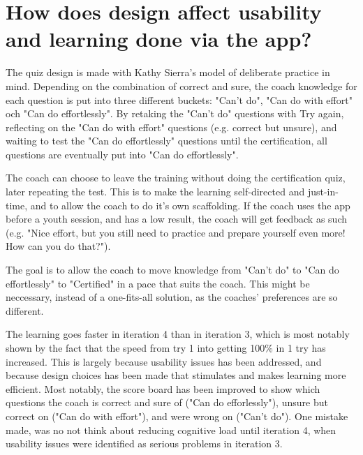 
\section{How does design affect usability and learning done via the app?}

  The quiz design is made with Kathy Sierra's model of deliberate practice in mind. \cite{sierra} Depending on the combination of correct and sure, the coach knowledge for each question is put into three different buckets: "Can't do", "Can do with effort" och "Can do effortlessly". By retaking the "Can't do" questions with Try again, reflecting on the "Can do with effort" questions (e.g. correct but unsure), and waiting to test the "Can do effortlessly" questions until the certification, all questions are eventually put into "Can do effortlessly".

  The coach can choose to leave the training without doing the certification quiz, later repeating the test. This is to make the learning self-directed and just-in-time, and to allow the coach to do it's own scaffolding. If the coach uses the app before a youth session, and has a low result, the coach will get feedback as such (e.g. "Nice effort, but you still need to practice and prepare yourself even more! How can you do that?").

  The goal is to allow the coach to move knowledge from "Can't do" to "Can do effortlessly" to "Certified" in a pace that suits the coach. This might be neccessary, instead of a one-fits-all solution, as the coaches' preferences are so different.

  The learning goes faster in iteration 4 than in iteration 3, which is most notably shown by the fact that the speed from try 1 into getting 100\% in 1 try has increased. This is largely because usability issues has been addressed, and because design choices has been made that stimulates and makes learning more efficient. Most notably, the score board has been improved to show which questions the coach is correct and sure of ("Can do efforlessly"), unsure but correct on ("Can do with effort"), and were wrong on ("Can't do"). One mistake made, was no not think about reducing cognitive load \cite{sierra} until iteration 4, when usability issues were identified as serious problems in iteration 3.

